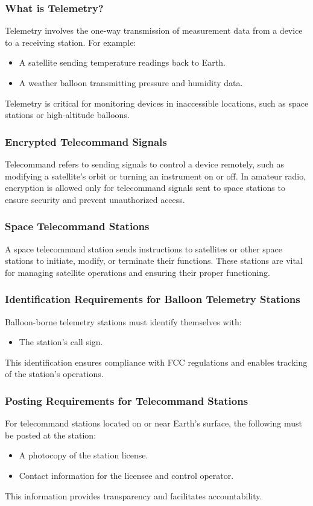 \subsubsection*{What is Telemetry?}
Telemetry involves the one-way transmission of measurement data from a device to a receiving station. For example:
\begin{itemize}
    \item A satellite sending temperature readings back to Earth.
    \item A weather balloon transmitting pressure and humidity data.
\end{itemize}
Telemetry is critical for monitoring devices in inaccessible locations, such as space stations or high-altitude balloons.

\subsubsection*{Encrypted Telecommand Signals}
Telecommand refers to sending signals to control a device remotely, such as modifying a satellite’s orbit or turning an instrument on or off. In amateur radio, encryption is allowed only for telecommand signals sent to space stations to ensure security and prevent unauthorized access.

\subsubsection*{Space Telecommand Stations}
A space telecommand station sends instructions to satellites or other space stations to initiate, modify, or terminate their functions. These stations are vital for managing satellite operations and ensuring their proper functioning.

\subsubsection*{Identification Requirements for Balloon Telemetry Stations}
Balloon-borne telemetry stations must identify themselves with:
\begin{itemize}
    \item The station’s call sign.
    \end{itemize}
This identification ensures compliance with FCC regulations and enables tracking of the station’s operations.

\subsubsection*{Posting Requirements for Telecommand Stations}
For telecommand stations located on or near Earth’s surface, the following must be posted at the station:
\begin{itemize}
    \item A photocopy of the station license.
    \item Contact information for the licensee and control operator.
\end{itemize}
This information provides transparency and facilitates accountability.

